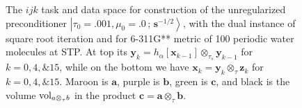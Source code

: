 \documentclass[letterpaper,twocolumn,amsmath,amsfont,amssymb,english,aps,jcp,preprintnumbers,groupaddress,nofootinbib,tightenlines,floatfix]{revtex4}
\newcommand{\mat}[1]{\boldsymbol{#1}}
\newcommand{\ot}{  {\scriptstyle \otimes}_{ \tau } }
\newcommand{\ots}{ {\scriptstyle \otimes}_{ \! \tau_s } }
\theoremstyle{plain}
\theoremstyle{remark}
\theoremstyle{plain}
\begin{document}
\begin{figure}[tb] 
\caption{
The $ijk$ task and data space for construction of the unregularized preconditioner 
$\left|\tau_0=.001,\mu_0=.0\, ; \,\scriptstyle{\mat{s}^{-1/2}} \right>$, with the 
dual instance of square root iteration  and for 6-311G** metric of 100 periodic water molecules
at STP.  At top its  $\mat{y}_k=h_\alpha[ \mat{x}_{k-1} ] \ots \mat{y}_{k-1}$
for $k=0,4,\& 15$, while on the bottom we have $\mat{x}_k=  \mat{y}_{k}  \ot \mat{z}_{k}$ for $k=0,4, \& 15$.
Maroon is $\mat{a}$, purple is $\mat{b}$, green is $\mat{c}$,  and black is the volume ${\rm vol}_{a \ot b}$
in the product $\mat{c}=\mat{a} \ot \mat{b}$.}\label{Lensing4}
\end{figure}
\end{document}
